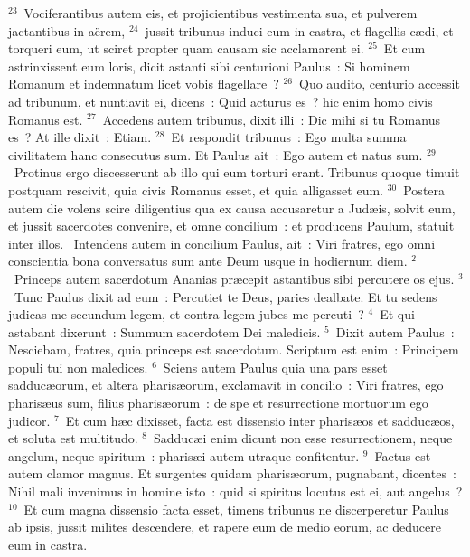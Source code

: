 ${}^{23}$~Vociferantibus autem eis, et projicientibus vestimenta sua, et pulverem jactantibus in a\"erem,
${}^{24}$~jussit tribunus induci eum in castra, et flagellis c\ae di, et torqueri eum, ut sciret propter quam causam sic acclamarent ei.
${}^{25}$~Et cum astrinxissent eum loris, dicit astanti sibi centurioni Paulus~: Si hominem Romanum et indemnatum licet vobis flagellare~?
${}^{26}$~Quo audito, centurio accessit ad tribunum, et nuntiavit ei, dicens~: Quid acturus es~? hic enim homo civis Romanus est.
${}^{27}$~Accedens autem tribunus, dixit illi~: Dic mihi si tu Romanus es~? At ille dixit~: Etiam.
${}^{28}$~Et respondit tribunus~: Ego multa summa civilitatem hanc consecutus sum. Et Paulus ait~: Ego autem et natus sum.
${}^{29}$~Protinus ergo discesserunt ab illo qui eum torturi erant. Tribunus quoque timuit postquam rescivit, quia civis Romanus esset, et quia alligasset eum.
${}^{30}$~Postera autem die volens scire diligentius qua ex causa accusaretur a Jud\ae is, solvit eum, et jussit sacerdotes convenire, et omne concilium~: et producens Paulum, statuit inter illos.
~\lettrine[lines=10,image=true,loversize=0.05,lraise=-0.03]{I}{}ntendens autem in concilium Paulus, ait~: Viri fratres, ego omni conscientia bona conversatus sum ante Deum usque in hodiernum diem.
${}^{2}$~Princeps autem sacerdotum Ananias pr\ae cepit astantibus sibi percutere os ejus.
${}^{3}$~Tunc Paulus dixit ad eum~: Percutiet te Deus, paries dealbate. Et tu sedens judicas me secundum legem, et contra legem jubes me percuti~?
${}^{4}$~Et qui astabant dixerunt~: Summum sacerdotem Dei maledicis.
${}^{5}$~Dixit autem Paulus~: Nesciebam, fratres, quia princeps est sacerdotum. Scriptum est enim~: Principem populi tui non maledices.
${}^{6}$~Sciens autem Paulus quia una pars esset sadduc\ae orum, et altera pharis\ae orum, exclamavit in concilio~: Viri fratres, ego pharis\ae us sum, filius pharis\ae orum~: de spe et resurrectione mortuorum ego judicor.
${}^{7}$~Et cum h\ae c dixisset, facta est dissensio inter pharis\ae os et sadduc\ae os, et soluta est multitudo.
${}^{8}$~Sadduc\ae i enim dicunt non esse resurrectionem, neque angelum, neque spiritum~: pharis\ae i autem utraque confitentur.
${}^{9}$~Factus est autem clamor magnus. Et surgentes quidam pharis\ae orum, pugnabant, dicentes~: Nihil mali invenimus in homine isto~: quid si spiritus locutus est ei, aut angelus~?
${}^{10}$~Et cum magna dissensio facta esset, timens tribunus ne discerperetur Paulus ab ipsis, jussit milites descendere, et rapere eum de medio eorum, ac deducere eum in castra.


